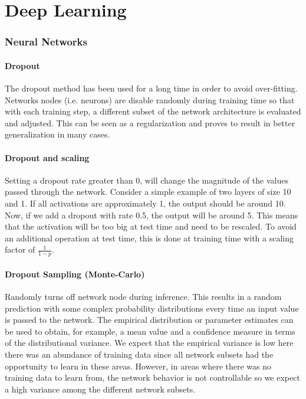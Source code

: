 \part{Deep Learning}

\section{Neural Networks}

\subsection{Dropout}
The dropout method has been used for a long time in order to avoid over-fitting. Networks nodes (i.e. neurons) are disable randomly during training time so that with each training step, a different subset of the network architecture is evaluated and adjusted. This can be seen as a regularization and proves to result in better generalization in many cases.

\subsection{Dropout and scaling}
Setting a dropout rate greater than 0, will change the magnitude of the values passed through the network. Consider a simple example of two layers of size 10 and 1. If all activations are approximately 1, the output should be around 10. Now, if we add a dropout with rate 0.5, the output will be around 5. This means that the activation will be too big at test time and need to be rescaled. To avoid an additional operation at test time, this is done at training time with a scaling factor of $\frac{1}{1-p}$.


\subsection{Dropout Sampling (Monte-Carlo)}
Randomly turns off network node during inference. This results in a random prediction with some complex probability distributions every time an input value is passed to the network. The empirical distribution or parameter estimates can be used to obtain, for example, a mean value and a confidence measure in terms of the distributional variance. We expect that the empirical variance is low here there was an abundance of training data since all network subsets had the opportunity to learn in these areas. However, in areas where there was no training data to learn from, the network behavior is not controllable so we expect a high variance among the different network subsets.


